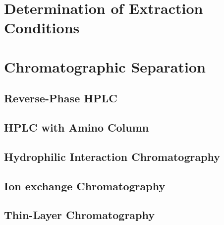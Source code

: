 
\section{Determination of Extraction Conditions} %
\label{sec:determination_of_extraction_conditions}


\section{Chromatographic Separation} %
\label{sec:chromatographic_separation}

    \subsection{Reverse-Phase HPLC} %
    \label{sub:reverse_phase_hplc}


    \subsection{HPLC with Amino Column} %
    \label{sub:hplc_with_amino_column}


    \subsection{Hydrophilic Interaction Chromatography} %
    \label{sub:hydrophilic_interaction_chromatography}


    \subsection{Ion exchange Chromatography} %
    \label{sub:ion_exchange_chromatography}


    \subsection{Thin-Layer Chromatography} %
    \label{sub:thin_layer_chromatography}

